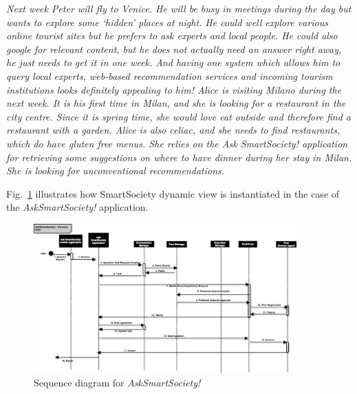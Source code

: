 \textit{Next week Peter will fly to Venice. He will be busy in meetings during the day but wants to explore some ‘hidden’ places at night. He could well explore various online tourist sites but he prefers to ask experts and local people. He could also google for relevant content, but he does not actually need an answer right away, he just needs to get it in one week. And having one system which allows him to query local experts, web-based recommendation services and incoming tourism institutions looks definitely appealing to him!
Alice is visiting Milano during the next week. It is his first time in Milan, and she is looking for a restaurant in the city centre. Since it is spring time, she would love eat outside and therefore  find a restaurant with a garden. Alice is also celiac, and she needs to find restaurants, which do have gluten free menus. She relies on the Ask SmartSociety! application for retrieving some suggestions on where to have dinner during her stay in Milan. She is looking for unconventional recommendations.}

Fig.~\ref{fig:dynamic_ask} illustrates how SmartSociety dynamic view is instantiated in the case of the \textit{AskSmartSociety!} application.

\begin{figure}
\centering
\includegraphics[width=0.9\textwidth]{./figs/sequenceAsk}%
\caption{Sequence diagram for \textit{AskSmartSociety!}}
\label{fig:dynamic_ask}
\end{figure}

